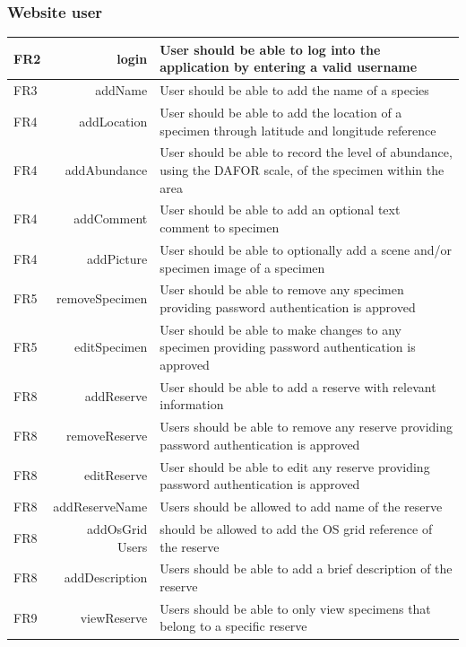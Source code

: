 	\subsubsection{Website user}
	\begin{tabular}{| l  r | p{10cm} |}
		\hline
		FR2 & login  & User should be able to log into the application by entering a valid username\\ \hline
		FR3 & addName & User should be able to add the name of a species \\ \hline
		FR4 & addLocation  & User should be able to add the location of a specimen through latitude and longitude reference \\ \hline
		FR4 & addAbundance & User should be able to record the level of abundance, using the DAFOR scale, of the specimen within the area \\ \hline
		FR4 & addComment & User should be able to add an optional text comment to specimen\\ \hline
		FR4 & addPicture & User should be able to optionally add a scene and/or specimen image of a specimen \\ \hline
		FR5 & removeSpecimen & User should be able to remove any specimen providing password authentication is approved \\ \hline
		FR5 & editSpecimen & User should be able to make changes to any specimen providing password authentication is approved \\ \hline
		FR8 & addReserve & User should be able to add a reserve with relevant information \\ \hline
		FR8 & removeReserve & Users should be able to remove any reserve providing password authentication is approved \\ \hline
		FR8 & editReserve & User should be able to edit any reserve providing password authentication is approved \\ \hline
		FR8 & addReserveName & Users should be allowed to add name of the reserve \\ \hline
		FR8 & addOsGrid Users & should be allowed to add the OS grid reference of the reserve \\ \hline
		FR8 & addDescription & Users should be able to add a brief description of the reserve \\ \hline
		FR9 & viewReserve & Users should be able to only view specimens that belong to a specific reserve \\ \hline
		
	\end{tabular} \\

